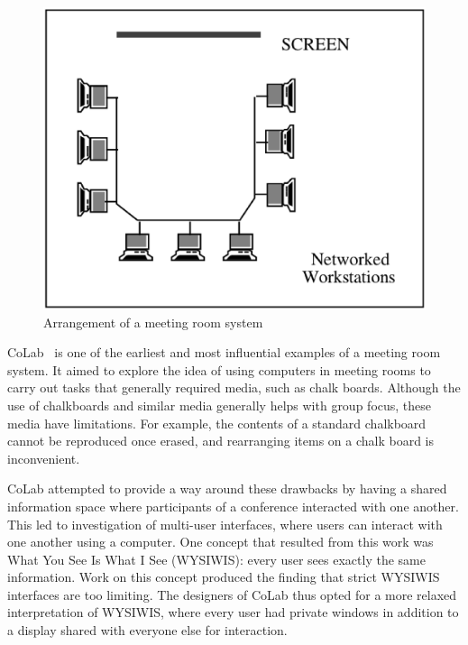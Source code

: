\begin{figure}[htp]
  \centering
  \includegraphics[scale=.47]{meeting_room_sys}
  \caption{Arrangement of a meeting room system\cite{journals/iwc/Rodden91}}
  \label{meeting_room_fig}
\end{figure}



CoLab~\cite{Stefik:1987:BCU} is one of the earliest and most
influential examples of a meeting room system. It aimed to explore the
idea of using computers in meeting rooms to carry out tasks that
generally required media, such as chalk boards. Although the use of
chalkboards and similar media generally helps with group focus, these
media have limitations.  For example, the contents of a standard
chalkboard cannot be reproduced once erased, and rearranging items on
a chalk board is inconvenient.

CoLab attempted to provide a way around these drawbacks by having a
shared information space where participants of a conference interacted
with one another. This led to investigation of multi-user interfaces,
where users can interact with one another using a computer.  One
concept that resulted from this work was What You See Is What I See
(WYSIWIS): every user sees exactly the same information.  Work on this
concept produced the finding that strict WYSIWIS interfaces are too
limiting.  The designers of CoLab thus opted for a more relaxed
interpretation of WYSIWIS, where every user had private windows in
addition to a display shared with everyone else for interaction.

